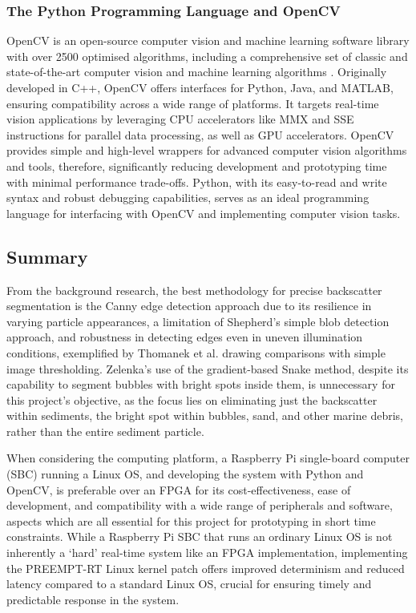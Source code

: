 \subsubsection{The Python Programming Language and OpenCV}

OpenCV is an open-source computer vision and machine learning software library with over 2500 optimised algorithms, including a comprehensive set of classic and state-of-the-art computer vision and machine learning algorithms \cite{opencv}. Originally developed in C++, OpenCV offers interfaces for Python, Java, and MATLAB, ensuring compatibility across a wide range of platforms. It targets real-time vision applications by leveraging CPU accelerators like MMX and SSE instructions for parallel data processing, as well as GPU accelerators. OpenCV provides simple and high-level wrappers for advanced computer vision algorithms and tools, therefore, significantly reducing development and prototyping time with minimal performance trade-offs. Python, with its easy-to-read and write syntax and robust debugging capabilities, serves as an ideal programming language for interfacing with OpenCV and implementing computer vision tasks.

\subsection{Summary}
\label{bisummary}

From the background research, the best methodology for precise backscatter segmentation is the Canny edge detection approach due to its resilience in varying particle appearances, a limitation of Shepherd's simple blob detection approach, and robustness in detecting edges even in uneven illumination conditions, exemplified by Thomanek et al. drawing comparisons with simple image thresholding. Zelenka's use of the gradient-based Snake method, despite its capability to segment bubbles with bright spots inside them, is unnecessary for this project's objective, as the focus lies on eliminating just the backscatter within sediments, the bright spot within bubbles, sand, and other marine debris, rather than the entire sediment particle.

When considering the computing platform, a Raspberry Pi single-board computer (SBC) running a Linux OS, and developing the system with Python and OpenCV, is preferable over an FPGA for its cost-effectiveness, ease of development, and compatibility with a wide range of peripherals and software, aspects which are all essential for this project for prototyping in short time constraints. While a Raspberry Pi SBC that runs an ordinary Linux OS is not inherently a `hard' real-time system like an FPGA implementation, implementing the PREEMPT-RT Linux kernel patch offers improved determinism and reduced latency compared to a standard Linux OS, crucial for ensuring timely and predictable response in the system.

